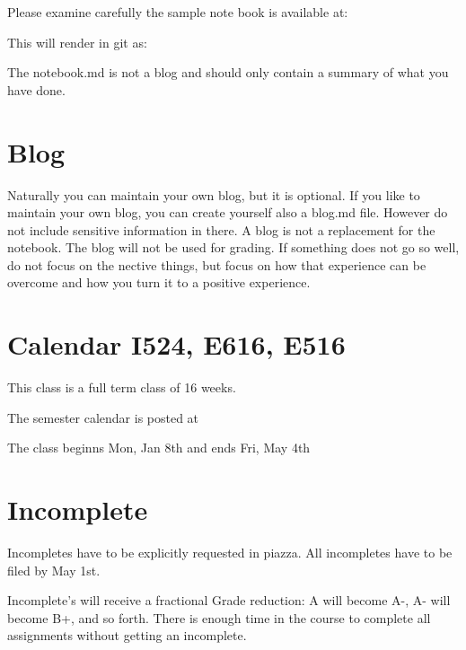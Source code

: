 Please examine carefully the sample note book is available at:


This will render in git as:


The notebook.md is not a blog and should only contain a summary of
what you have done. 

\section{Blog}

Naturally you can maintain your own blog, but it is optional. If you
like to maintain your own blog, you can create yourself also a blog.md
file. However do not include sensitive information in there. A blog is
not a replacement for the notebook. The blog will not be used for
grading. If something does not go so well, do not focus on the nective
things, but focus on how that experience can be overcome and how you
turn it to a positive experience.

\section{Calendar I524, E616, E516}\label{S:calendar}

This class is a full term class of 16 weeks.

\begin{IU}

The semester calendar is posted at 


The class beginns Mon, Jan 8th and ends Fri, May 4th

\end{IU}



\section{Incomplete}\label{incomplete}

Incompletes have to be explicitly requested in piazza. All incompletes
have to be filed by May 1st.

Incomplete's will receive a fractional Grade reduction: A will
become A-, A- will become B+, and so forth. There is enough time in the
course to complete all assignments without getting an incomplete.

